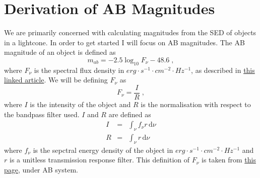 \documentclass[12pt]{scrartcl}
\newcommand{\dx}[1]{\ensuremath{\,\mathrm{d}#1}}
\begin{document}
\maketitle

\section{Derivation of AB Magnitudes}

We are primarily concerned with calculating magnitudes from the SED
of objects in a lightcone. In order to get started I will focus on AB
magnitudes. The AB magnitude of an object is defined as
\[ m_{ab} = -2.5\log_{10}F_{\nu} - 48.6 \; , \]
where $F_\nu$ is the spectral flux density in $erg\cdot s^{-1}\cdot cm^{-2} \cdot Hz^{-1}$,
as described in \href{http://meghnad.iucaa.ernet.in/~dipankar/ph217/magnitudes.pdf}{this linked article}. We will be defining $F_\nu$ as
\[ F_\nu = \frac{I}{R} \; , \]
where $I$ is the intensity of the object and $R$ is the normalisation
with respect to the bandpass filter used. $I$ and $R$ are defined
as
\begin{eqnarray*}
I & = & \int_\nu f_\nu r \dx{\nu} \\
R & = & \int_\nu r \dx{\nu}
\end{eqnarray*}
where $f_\nu$ is the sepctral energy density of the object in
$erg\cdot s^{-1}\cdot cm^{-2}\cdot Hz^{-1}$ and $r$ is a unitless transmission
response filter. This definition of $F_\nu$ is taken from \href{http://dls.physics.ucdavis.edu/calib/vegaab.html}{this page}, under AB system.
\end{document}
